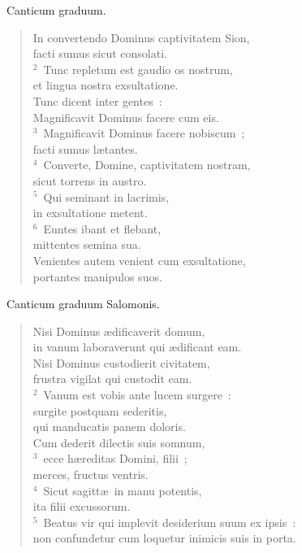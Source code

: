 ~\lettrine[lines=10,image=true,loversize=0.05,lraise=-0.03]{C}{}anticum graduum. \begin{flushleft}\begin{verse}\vspace{6pt}In convertendo Dominus captivitatem Sion,\\ facti sumus sicut consolati.\\
${}^{2}$~Tunc repletum est gaudio os nostrum,\\ et lingua nostra exsultatione.\\ Tunc dicent inter gentes~:\\ Magnificavit Dominus facere cum eis.\\
${}^{3}$~Magnificavit Dominus facere nobiscum~;\\ facti sumus l\ae tantes.\\
${}^{4}$~Converte, Domine, captivitatem nostram,\\ sicut torrens in austro.\\
${}^{5}$~Qui seminant in lacrimis,\\ in exsultatione metent.\\
${}^{6}$~Euntes ibant et flebant,\\ mittentes semina sua.\\ Venientes autem venient cum exsultatione,\\ portantes manipulos suos.\end{verse}\end{flushleft}


~\lettrine[lines=10,image=true,loversize=0.05,lraise=-0.03]{C}{}anticum graduum Salomonis. \begin{flushleft}\begin{verse}\vspace{6pt}Nisi Dominus \ae dificaverit domum,\\ in vanum laboraverunt qui \ae dificant eam.\\ Nisi Dominus custodierit civitatem,\\ frustra vigilat qui custodit eam.\\
${}^{2}$~Vanum est vobis ante lucem surgere~:\\ surgite postquam sederitis,\\ qui manducatis panem doloris.\\ Cum dederit dilectis suis somnum,\\
${}^{3}$~ecce h\ae reditas Domini, filii~;\\ merces, fructus ventris.\\
${}^{4}$~Sicut sagitt\ae\ in manu potentis,\\ ita filii excussorum.\\
${}^{5}$~Beatus vir qui implevit desiderium suum ex ipsis~:\\ non confundetur cum loquetur inimicis suis in porta.\end{verse}\end{flushleft}



